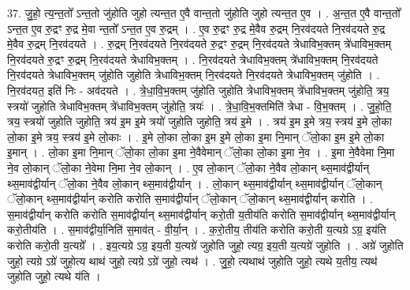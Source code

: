 \documentclass[17pt]{extarticle}
\begin{document}
37. जु॒हो॒ त्य॒न्त॒तो᳚ ऽन्त॒तो जु॑होति जुहो त्यन्त॒त ए॒वै वान्त॒तो जु॑होति जुहो त्यन्त॒त ए॒व । . अ॒न्त॒त ए॒वै वान्त॒तो᳚ ऽन्त॒त ए॒व रु॒द्रꣳ रु॒द्र मे॒वा न्त॒तो᳚ ऽन्त॒त ए॒व रु॒द्रम् । . ए॒व रु॒द्रꣳ रु॒द्र मे॒वैव रु॒द्रम् नि॒रव॑दयते नि॒रव॑दयते रु॒द्र मे॒वैव रु॒द्रम् नि॒रव॑दयते । . रु॒द्रम् नि॒रव॑दयते नि॒रव॑दयते रु॒द्रꣳ रु॒द्रम् नि॒रव॑दयते त्रेधाविभ॒क्तम् त्रे॑धाविभ॒क्तम् नि॒रव॑दयते रु॒द्रꣳ रु॒द्रम् नि॒रव॑दयते त्रेधाविभ॒क्तम् । . नि॒रव॑दयते त्रेधाविभ॒क्तम् त्रे॑धाविभ॒क्तम् नि॒रव॑दयते नि॒रव॑दयते त्रेधाविभ॒क्तम् जु॑होति जुहोति त्रेधाविभ॒क्तम् नि॒रव॑दयते नि॒रव॑दयते त्रेधाविभ॒क्तम् जु॑होति । . नि॒रव॑दयत॒ इति॑ निः - अव॑दयते । . त्रे॒धा॒वि॒भ॒क्तम् जु॑होति जुहोति त्रेधाविभ॒क्तम् त्रे॑धाविभ॒क्तम् जु॑होति॒ त्रय॒ स्त्रयो॑ जुहोति त्रेधाविभ॒क्तम् त्रे॑धाविभ॒क्तम् जु॑होति॒ त्रयः॑ । . त्रे॒धा॒वि॒भ॒क्तमिति॑ त्रेधा - वि॒भ॒क्तम् । . जु॒हो॒ति॒ त्रय॒ स्त्रयो॑ जुहोति जुहोति॒ त्रय॑ इ॒म इ॒मे त्रयो॑ जुहोति जुहोति॒ त्रय॑ इ॒मे । . त्रय॑ इ॒म इ॒मे त्रय॒ स्त्रय॑ इ॒मे लो॒का लो॒का इ॒मे त्रय॒ स्त्रय॑ इ॒मे लो॒काः । . इ॒मे लो॒का लो॒का इ॒म इ॒मे लो॒का इ॒मा नि॒मान् ॅलो॒का इ॒म इ॒मे लो॒का इ॒मान् । . लो॒का इ॒मा नि॒मान् ॅलो॒का लो॒का इ॒मा ने॒वैवेमान् ॅलो॒का लो॒का इ॒मा ने॒व । . इ॒मा ने॒वैवेमा नि॒मा ने॒व लो॒कान् ॅलो॒का ने॒वेमा नि॒मा ने॒व लो॒कान् । . ए॒व लो॒कान् ॅलो॒का ने॒वैव लो॒कान् थ्स॒माव॑द्वीर्यान् थ्स॒माव॑द्वीर्यान् ॅलो॒का ने॒वैव लो॒कान् थ्स॒माव॑द्वीर्यान् । . लो॒कान् थ्स॒माव॑द्वीर्यान् थ्स॒माव॑द्वीर्यान् ॅलो॒कान् ॅलो॒कान् थ्स॒माव॑द्वीर्यान् करोति करोति स॒माव॑द्वीर्यान् ॅलो॒कान् ॅलो॒कान् थ्स॒माव॑द्वीर्यान् करोति । . स॒माव॑द्वीर्यान् करोति करोति स॒माव॑द्वीर्यान् थ्स॒माव॑द्वीर्यान् करो॒ती य॒तीय॑ति करोति स॒माव॑द्वीर्यान् थ्स॒माव॑द्वीर्यान् करो॒तीय॑ति । . स॒माव॑द्वीर्या॒निति॑ स॒माव॑त् - वी॒र्या॒न् । . क॒रो॒तीय॒ तीय॑ति करोति करो॒ती य॒त्यग्रे ऽग्र॒ इय॑ति करोति करो॒ती य॒त्यग्रे᳚ । . इय॒त्यग्रे ऽग्र॒ इय॒ती य॒त्यग्रे॑ जुहोति जुहो॒ त्यग्र॒ इय॒ती य॒त्यग्रे॑ जुहोति । . अग्रे॑ जुहोति जुहो॒ त्यग्रे ऽग्रे॑ जुहो॒त्य थाथ॑ जुहो॒ त्यग्रे ऽग्रे॑ जुहो॒ त्यथ॑ । . जु॒हो॒ त्यथाथ॑ जुहोति जुहो॒ त्यथे य॒तीय॒ त्यथ॑ जुहोति जुहो॒ त्यथे य॑ति । \newline
\pagebreak
{}
\end{document}
